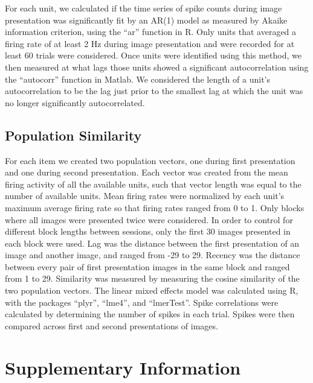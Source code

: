 \documentclass{apa}
\begin{document}
For each unit, we calculated if the time series of spike counts during image presentation 
was significantly fit by an AR(1) model as measured by Akaike information criterion, using the
``ar'' function in R. Only units that averaged a firing rate of at least 2 Hz during image presentation 
and were recorded for at least 60 trials were considered.
Once units were identified using this method, we then measured at what lags
those units showed a significant autocorrelation using the ``autocorr'' function in Matlab. We
considered the length of a unit's autocorrelation to be the lag just prior to the smallest lag 
at which the unit was no longer significantly autocorrelated.

\subsection{Population Similarity}

For each item we created two population vectors, one during first
presentation and one during second presentation. Each vector was created from
the mean firing activity of all the available units, such that vector length
was equal to the number of available units. Mean firing rates were normalized
by each unit's maximum average firing rate so that firing rates ranged from 0
to 1. Only blocks where all images were presented twice were considered. In
order to control for different block lengths between sessions, only the first
30 images presented in each block were used. Lag was the distance between the
first presentation of an image and another image, and ranged from -29 to 29.
Recency was the distance between every pair of first presentation images in
the same block and ranged from 1 to 29. Similarity was measured by measuring
the cosine similarity of the two population vectors. The linear mixed effects
model was calculated using R, with the packages ``plyr'', ``lme4'', and
``lmerTest''. Spike correlations were calculated by determining the number of
spikes in each trial. Spikes were then compared across first and second
presentations of images.

\nocite{Wick11,KuznEtal17,BateEtal14}


\clearpage

\setcounter{figure}{0}
\renewcommand{\thefigure}{S\arabic{figure}}

\setcounter{equation}{0}
\renewcommand{\theequation}{S\arabic{equation}}


\section{Supplementary Information}
\end{document}
